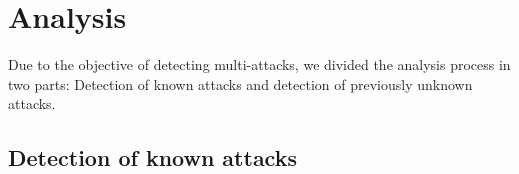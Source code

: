 \documentclass{article}
\begin{document}
\section{Analysis}
Due to the objective of detecting multi-attacks, we divided the analysis process in two parts: Detection of known attacks and detection of previously unknown attacks.
\subsection{Detection of known attacks}


\end{document}
